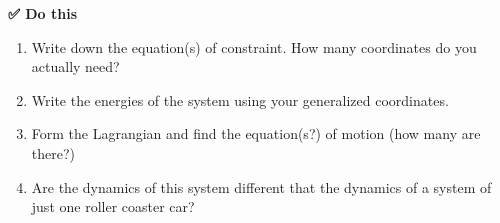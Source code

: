 \textbf{✅ Do this}

\begin{enumerate}
\def\labelenumi{\arabic{enumi}.}
\tightlist
\item
  Write down the equation(s) of constraint. How many coordinates do you
  actually need?
\item
  Write the energies of the system using your generalized coordinates.
\item
  Form the Lagrangian and find the equation(s?) of motion (how many are
  there?)
\item
  Are the dynamics of this system different that the dynamics of a
  system of just one roller coaster car?
\end{enumerate}
